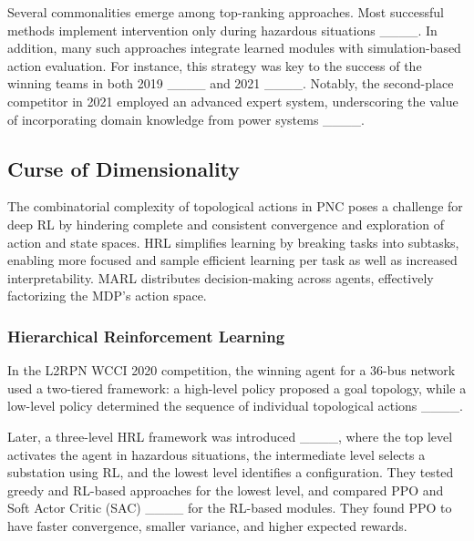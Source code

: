 Several commonalities emerge among top-ranking approaches. Most successful methods implement intervention only during hazardous situations ____. 
In addition, many such approaches integrate learned modules with simulation-based action evaluation. For instance, this strategy was key to the success of the winning teams in both 2019 ____ and 2021 ____. 
Notably, the second-place competitor in 2021 employed an advanced expert system, underscoring the value of incorporating domain knowledge from power systems ____. %

\subsection{Curse of Dimensionality}\label{sec:SRL}
The combinatorial complexity of topological actions in PNC poses a challenge for deep RL by hindering complete and consistent convergence and exploration of action and state spaces. HRL simplifies learning by breaking tasks into subtasks, enabling more focused and sample efficient learning per task as well as increased interpretability. MARL distributes decision-making across agents, effectively factorizing the MDP's action space.

\subsubsection{Hierarchical Reinforcement Learning}
In the L2RPN WCCI 2020 competition, the winning agent for a 36-bus network used a two-tiered framework: a high-level policy proposed a goal topology, while a low-level policy determined the sequence of individual topological actions ____.

Later, a three-level HRL framework was introduced ____, where the top level activates the agent in hazardous situations, the intermediate level selects a substation using RL, and the lowest level identifies a configuration. They tested greedy and RL-based approaches for the lowest level, and compared PPO and Soft Actor Critic (SAC) ____ for the RL-based modules. They found PPO to have faster convergence, smaller variance, and higher expected rewards.

